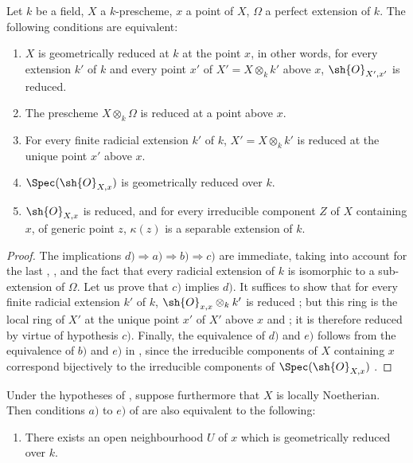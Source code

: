 \begin{proposition}[4.6.12]
\label{IV.4.6.12}
Let $k$ be a field, $X$ a $k$-prescheme, $x$ a point of $X$, $\Omega$ a perfect extension of $k$.
The following conditions are equivalent:
\begin{enumerate}[label=\emph{\alph*)}]
  \item $X$ is geometrically reduced at $k$ at the point $x$, in other words, for every extension $k'$ of $k$ and every point $x'$ of $X'=X\otimes_k k'$ above $x$, $\sh{O}_{X',x'}$ is reduced.
  \item The prescheme $X\otimes_k\Omega$ is reduced at a point above $x$.
  \item For every finite radicial extension $k'$ of $k$, $X'=X\otimes_k k'$ is reduced at the unique point $x'$ above $x$.
  \item $\Spec(\sh{O}_{X,x})$ is geometrically reduced over $k$.
  \item $\sh{O}_{X,x}$ is reduced, and for every irreducible component $Z$ of $X$ containing $x$, of generic point $z$, $\kappa(z)$ is a separable extension of $k$.
\end{enumerate}
\end{proposition}

\begin{proof}
The implications $d)\Rightarrow a)\Rightarrow b)\Rightarrow c)$ are immediate, taking into account for the last , , and the fact that every radicial extension of $k$ is isomorphic to a sub-extension of $\Omega$.
Let us prove that $c)$ implies $d)$.
It suffices to show that for every finite radicial extension $k'$ of $k$, $\sh{O}_{x,x}\otimes_k k'$ is reduced ; but this ring is the local ring of $X'$ at the unique point $x'$ of $X'$ above $x$  and ; it is therefore reduced by virtue of hypothesis $c)$.
Finally, the equivalence of $d)$ and $e)$ follows from the equivalence of $b)$ and $e)$ in , since the irreducible components of $X$ containing $x$ correspond bijectively to the irreducible components of $\Spec(\sh{O}_{X,x})$ .
\end{proof}

\begin{corollary}[4.6.13]
\label{IV.4.6.13}
Under the hypotheses of , suppose furthermore that $X$ is locally Noetherian.
Then conditions $a)$ to $e)$ of  are also equivalent to the following:
\begin{enumerate}
  \item[\emph{f)}] There exists an open neighbourhood $U$ of $x$ which is geometrically reduced over $k$.
\end{enumerate}
\end{corollary}

